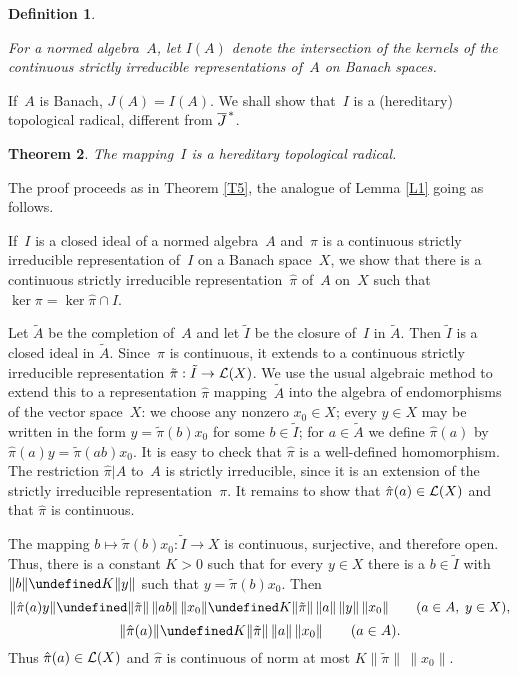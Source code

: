 \documentclass[11pt]{article}
\let\leq\undefined  \let\geq\undefined
\let\le\leq   \let\ge\geq
\newcommand{\closure}[1]{\overline{#1}}
\newtheorem{thm}{Theorem}[section]
\newenvironment{Proof}{{\it Proof. }}{}%
\newtheorem{definition}[thm]{Definition}
\newenvironment{Defn}{\begin{definition}\begin{rm}}{\end{rm}\end{definition}}
\newcommand{\barstar}[1]{{\closure{#1}\kern 1pt}^*}
\newcommand{\LX}{{\cal L}(X)}
\begin{document}
\begin{Defn}
For a normed algebra~$A$, let $I(A)$ denote the intersection of the kernels of
the continuous strictly irreducible representations of~$A$ on Banach spaces.
\end{Defn}

If~$A$ is Banach, $J(A) = I(A)$.    We shall show that~$I$ is a
(hereditary) topological radical, different from $\barstar J$.

\begin{thm}\label{T11}
The mapping~$I$ is a hereditary topological radical.
\end{thm}

\begin{Proof}
The proof proceeds as in Theorem \ref{T5}, the analogue of Lemma \ref{L1}
going as follows.

If~$I$ is a closed ideal of a normed algebra~$A$ and~$\pi$ is a
continuous strictly irreducible representation of~$I$ on a Banach
space~$X$, we show that there is a continuous strictly irreducible
representation~$\hat\pi$ of~$A$ on~$X$ such that
$\ker\pi = \ker\hat\pi\cap I$.

Let $\tilde A$ be the completion of~$A$ and let $\tilde I$ be the
closure of~$I$ in $\tilde A$. Then $\tilde I$ is a closed ideal in
$\tilde A$. Since~$\pi$ is continuous, it extends to a continuous
strictly irreducible representation $\tilde\pi:\tilde I \to \LX$. We use
the usual algebraic method to extend this to a representation $\hat\pi$
mapping~$\tilde A$ into the algebra of endomorphisms of the vector
space~$X$: we choose any nonzero $x_0 \in X$; every $y \in X$ may be
written in the form $y = \tilde\pi(b)x_0$ for some $b \in \tilde I$; for
$a \in \tilde A$ we define $\hat\pi(a)$ by $\hat\pi(a)y =
\tilde\pi(ab)x_0$. It is easy to check that $\hat\pi$ is a well-defined
homomorphism. The restriction $\hat\pi|A$ to~$A$ is strictly
irreducible, since it is an extension of the strictly irreducible
representation~$\pi$. It remains to show that $\hat\pi(a) \in \LX$
and that $\hat\pi$ is continuous.

The mapping $b \mapsto \tilde\pi(b)x_0:\tilde I \to X$ is continuous,
surjective, and therefore open.   Thus, there is a constant $K > 0$ such that
for every $y \in X$ there is a $b \in \tilde I$ with $\|b\| \le K\|y\|$ such
that $y = \tilde\pi(b)x_0$.   Then
$$\|\hat\pi(a)y\| \le \|\tilde\pi\|\,\|ab\|\,\|x_0\|
                  \le K\|\tilde\pi\|\,\|a\|\,\|y\|\,\|x_0\|\qquad(a \in A,\;y\in X),$$
$$\|\hat\pi(a)\| \le K\|\tilde\pi\|\,\|a\|\,\|x_0\|\qquad(a \in A).$$
Thus $\hat\pi(a)\in \LX$ and $\hat\pi$ is continuous of norm at most
$K\|\tilde\pi\|\,\|x_0\|$.
\end{Proof}
\end{document}
